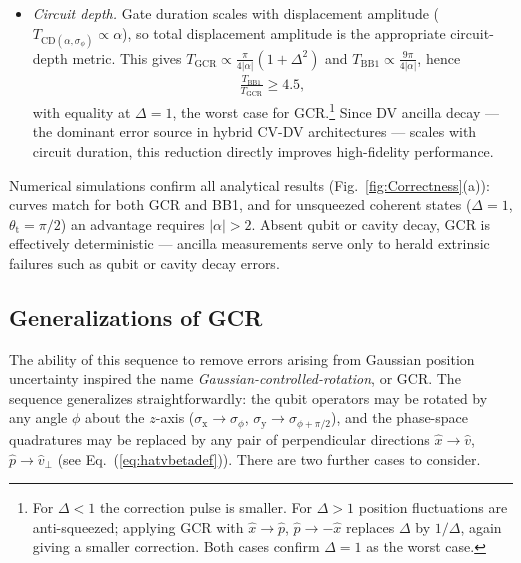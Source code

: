 \documentclass[aps,prx,showpacs,notitlepage,twocolumn,superscriptaddress,nofootinbib,preprintnumbers,floatfix,10pt, longbibliography]{revtex4-2}
\begin{document}
\begin{itemize}
\begin{align}
\end{align}
 GCR trades a softer $\chi^4$ scaling for lower absolute infidelity in the operating regime for $\chi$ such that $|\alpha|\ge 2$ (see Fig.~\ref{fig:Correctness}). For example, we explicitly compute the values for several metrics at $\alpha=2$ in  Table~\ref{tab:algorithm_comparison}.
 \item \textit{Circuit depth.}
Gate duration scales with displacement amplitude ($T_{\mathrm{CD}(\alpha,\sigma_\phi)}\propto\alpha$), so total displacement amplitude is the appropriate circuit-depth metric. This gives $T_\mathrm{GCR}\propto\frac{\pi}{4|\alpha|}(1+\Delta^2)$ and $T_\mathrm{BB1}\propto\frac{9\pi}{4|\alpha|}$, hence
\begin{align}
  \frac{T_\mathrm{BB1}}{T_\mathrm{GCR}}\ge 4.5,
\end{align}
with equality at $\Delta=1$, the worst case for GCR.\footnote{For $\Delta<1$ the correction pulse is smaller. For $\Delta>1$ position fluctuations are anti-squeezed; applying GCR with $\hat{x}\to\hat{p}$, $\hat{p}\to-\hat{x}$ replaces $\Delta$ by $1/\Delta$, again giving a smaller correction. Both cases confirm $\Delta=1$ as the worst case.}
Since DV ancilla decay --- the dominant error source in hybrid CV-DV architectures --- scales with circuit duration, this reduction directly improves high-fidelity performance.
\end{itemize}





Numerical simulations confirm all analytical results (Fig.~\ref{fig:Correctness}(a)): curves match for both GCR and BB1, and for unsqueezed coherent states ($\Delta=1$, $\theta_\mathrm{t}=\pi/2$) an advantage requires $|\alpha|>2$. Absent qubit or cavity decay, GCR is effectively deterministic --- ancilla measurements serve only to herald extrinsic failures such as qubit or cavity decay errors. 

\subsection{Generalizations of GCR}\label{ssec:pnot0}

The ability of this sequence to remove errors arising from Gaussian position uncertainty inspired 
the name \emph{Gaussian-controlled-rotation}, or GCR. The sequence generalizes straightforwardly: 
the qubit operators may be rotated by any angle $\phi$ about the $z$-axis 
($\sigma_{\mathrm{x}}\to\sigma_\phi$, $\sigma_{\mathrm{y}}\to\sigma_{\phi+\pi/2}$), and the 
phase-space quadratures may be replaced by any pair of perpendicular directions $\hat{x}\to\hat{v}$, 
$\hat{p}\to\hat{v}_\perp$ (see Eq.~(\ref{eq:hatvbetadef})). There are two further cases to consider.
\end{document}
